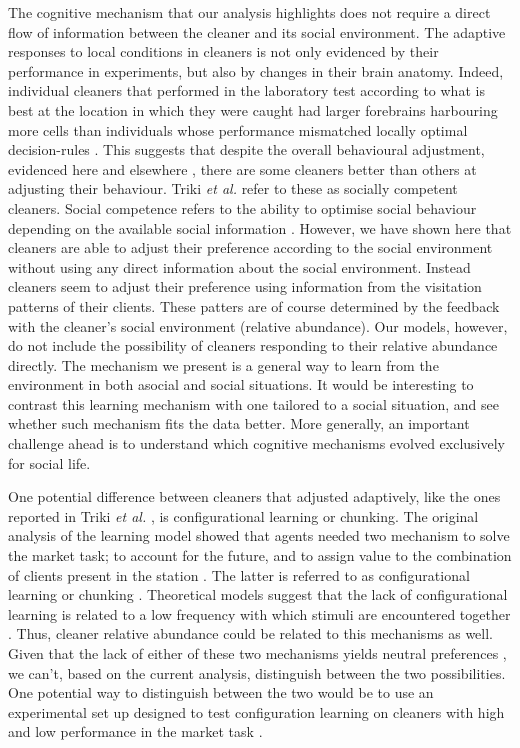 \documentclass[]{rsos}%
\begin{document}
The cognitive mechanism that our analysis highlights does not require a
direct flow of information between the cleaner and its social
environment. The adaptive responses to local conditions in cleaners is
not only evidenced by their performance in experiments, but also by
changes in their brain anatomy. Indeed, individual cleaners that
performed in the laboratory test according to what is best at the
location in which they were caught had larger forebrains harbouring more
cells than individuals whose performance mismatched locally optimal
decision-rules \citep{triki_Brain_2020}. This suggests that despite the
overall behavioural adjustment, evidenced here and elsewhere
\citep{triki_Biological_2019, triki_Decrease_2018}, there are some
cleaners better than others at adjusting their behaviour. Triki \emph{et al.}
\citep{triki_Brain_2020} refer to these as socially competent cleaners. Social
competence refers to the ability to optimise social behaviour depending
on the available social information \citep{taborsky_Social_2012a, bshary_Cooperation_2015}. However, we have shown here that cleaners
are able to adjust their preference according to the social environment
without using any direct information about the social environment.
Instead cleaners seem to adjust their preference using information from
the visitation patterns of their clients. These patters are of course
determined by the feedback with the cleaner's social environment
(relative abundance). Our models, however, do not include the
possibility of cleaners responding to their relative abundance directly.
The mechanism we present is a general way to learn from the environment
in both asocial and social situations. It would be interesting to
contrast this learning mechanism with one tailored to a social
situation, and see whether such mechanism fits the data better. More
generally, an important challenge ahead is to understand which cognitive
mechanisms evolved exclusively for social life.

One potential difference between cleaners that adjusted adaptively, like
the ones reported in Triki \emph{et al.} \citep{triki_Brain_2020}, is configurational learning or
chunking. The original analysis of the learning model showed that agents
needed two mechanism to solve the market task; to account for the
future, and to assign value to the combination of clients present in the
station \citep{quinones_Reinforcement_2019}. The latter is referred to as
configurational learning or chunking \citep{sutherland_Configural_1989, miller_Magical_1956}. Theoretical models suggest that the lack of
configurational learning is related to a low frequency with which
stimuli are encountered together \citep{kolodny_Evolution_2014, prat_Role_2021}. Thus, cleaner relative abundance could be related to
this mechanisms as well. Given that the lack of either of these two
mechanisms yields neutral preferences \citep{quinones_Reinforcement_2019},
we can't, based on the current analysis, distinguish between the two
possibilities. One potential way to distinguish between the two would be
to use an experimental set up designed to test configuration learning on
cleaners with high and low performance in the market task
\citep{woodbury_Learning_1943, sutherland_Configural_1989}.
\end{document}
